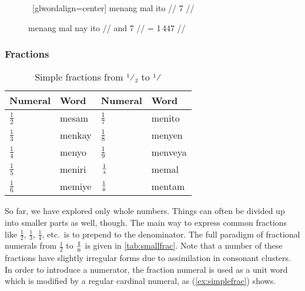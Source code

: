 \begin{figure}[h]
\pex~[glwordalign=center]\label{ex:numsgldig}
\a\ljudge\ques\begingl
	\gla menang mal ito //
	 {\ten} {7} //
\endgl

\a\begingl
	\gla menang mal nay ito //
	 {\ten} and {7} //
	\glft {} = 1\,447 //
\endgl
\xe
\end{figure}

\subsubsection{Fractions}

\begin{table}[p]\centering
\caption[Simple fractions from $\frac{1}{2}$ to $\frac{1}{\elv}$]{Simple 
fractions from ¹⁄₂ to ¹⁄\tsub{\elv}}
\begin{tabu} to .75\linewidth {X[c] I X[c] I}
\toprule\tableheaderfont
Numeral
	& Word
	& Numeral
	& Word
	\\
\toprule

$\frac{1}{2}$
	& mesam %
	& $\frac{1}{7}$
	& menito %
	\\ [.25\baselineskip]

$\frac{1}{3}$
	& menkay %
	& $\frac{1}{8}$
	& menyen %
	\\ [.25\baselineskip]

$\frac{1}{4}$
	& menyo %
	& $\frac{1}{9}$
	& menveya %
	\\ [.25\baselineskip]

$\frac{1}{5}$
	& meniri %
	& $\frac{1}{\textsc{a}}$
	& memal %
	\\ [.25\baselineskip]

$\frac{1}{6}$
	& memiye %
	& $\frac{1}{\elv}$
	& mentam %
	\\

\bottomrule
\end{tabu}
\label{tab:smallfrac}
\end{table}

So far, we have explored only whole numbers. Things can often be divided up
into smaller parts as well, though. The main way to express common fractions
like $\frac{1}{2}$, $\frac{1}{3}$, $\frac{1}{4}$, etc.\ is to prepend
 to the denominator. The full paradigm of fractional
numerals from $\frac{1}{2}$ to $\frac{1}{\elv}$ is given in
\autoref{tab:smallfrac}. Note that a number of these fractions have slightly
irregular forms due to assimilation in consonant clusters. In order to
introduce a numerator, the fraction numeral is used as a unit word which is
modified by a regular cardinal numeral, as (\ref{ex:simplefrac}) shows.

